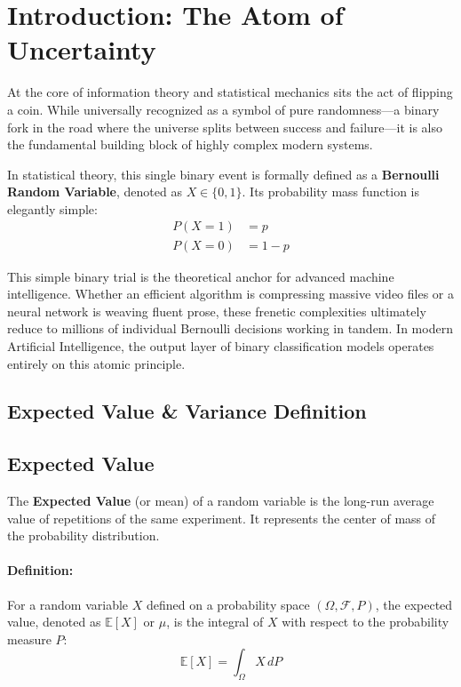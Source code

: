 \documentclass[12pt]{article}
\newcommand{\purplehighlight}[1]{\textcolor{purplehl}{\textbf{#1}}}
\begin{document}
\newpage
\section{Introduction: The Atom of Uncertainty}
At the core of information theory and statistical mechanics sits the act of flipping a coin. While universally recognized as a symbol of pure randomness---a binary fork in the road where the universe splits between success and failure---it is also the fundamental building block of highly complex modern systems.

In statistical theory, this single binary event is formally defined as a \purplehighlight{Bernoulli Random Variable}, denoted as $X \in \{0, 1\}$. Its probability mass function is elegantly simple:
\begin{align*}
P(X = 1) &= p \\
P(X = 0) &= 1 - p
\end{align*}

This simple binary trial is the theoretical anchor for advanced machine intelligence. Whether an efficient algorithm is compressing massive video files or a neural network is weaving fluent prose, these frenetic complexities ultimately reduce to millions of individual Bernoulli decisions working in tandem. In modern Artificial Intelligence, the output layer of binary classification models operates entirely on this atomic principle.


\subsection{Expected Value \& Variance Definition}

\subsection*{Expected Value}

The \textbf{Expected Value} (or mean) of a random variable is the long-run average value of repetitions of the same experiment. It represents the center of mass of the probability distribution.

\paragraph{Definition:}
For a random variable $X$ defined on a probability space $(\Omega, \mathcal{F}, P)$, the expected value, denoted as $\mathbb{E}[X]$ or $\mu$, is the integral of $X$ with respect to the probability measure $P$:
\[
\mathbb{E}[X] = \int_{\Omega} X \, dP
\]
\end{document}

